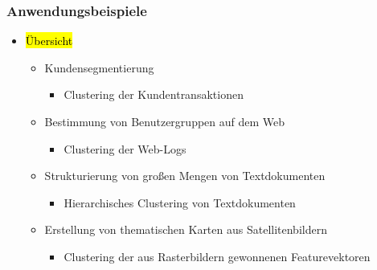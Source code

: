 \begin{frame}%
\frametitle{Anwendungsbeispiele}

\begin{itemize}
\item \hl{Übersicht}
\begin{itemize}
\item  Kundensegmentierung 
\begin{itemize}
\item  Clustering der Kundentransaktionen 
\end{itemize}
\item  Bestimmung von Benutzergruppen auf dem Web 
\begin{itemize}
\item  Clustering der Web-Logs 
\end{itemize}
\item  Strukturierung von großen Mengen von Textdokumenten 
\begin{itemize}
\item  Hierarchisches Clustering von Textdokumenten 
\end{itemize}
\item  Erstellung von thematischen Karten aus Satellitenbildern 
\begin{itemize}
\item  Clustering der aus Rasterbildern gewonnenen Featurevektoren 
\end{itemize}
\end{itemize}
\end{itemize}

\end{frame}



